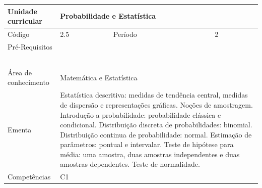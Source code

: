 \clearpage
\newpage

\begin{quadro}[ht!]
  \centering\scriptsize
\caption{Unidade Curricular Probabilidade e Estatística}

\begin{tabular}{|p{2.5cm}|p{2.5cm}|p{2.5cm}|p{2.5cm}|p{2.5cm}|}\hline

  Unidade curricular & \multicolumn{4}{p{10cm}|}{ Probabilidade e Estatística }\\\hline
  Código & 2.5 & Período & \multicolumn{2}{p{5cm}|}{ 2 }\\\hline
  Pré-Requisitos & \multicolumn{4}{p{10cm}|}{  } \\\hline
  \cellcolor{blue1}{ CH PRESENCIAL } &
    \cellcolor{blue1}{CH EAD Síncrona} &
    \cellcolor{blue1}{CH EAD Síncrona Mediada} &
    \cellcolor{blue1}{CH EAD Assíncrona} &
    \cellcolor{blue1}{CH APCC} \\\hline
  \cellcolor{blue1}{ 60 } &
    \cellcolor{blue1}{ 0 } &
    \cellcolor{blue1}{ 0 } &
    \cellcolor{blue1}{ 0 } &
    \cellcolor{blue1}{0} \\\hline
  \cellcolor{blue1}{ CH Teórica } &
    \cellcolor{blue1}{CH Prática} &
    \cellcolor{blue1}{CH Humanidades} &
    \cellcolor{blue1}{CH Extensão} &
    \cellcolor{blue1}{CH EAD TOTAL} \\\hline
  \cellcolor{blue1}{ 30 } &
    \cellcolor{blue1}{ 30 } &
    \cellcolor{blue1}{ 0 } &
    \cellcolor{blue1}{ 0 } &
    \cellcolor{blue1}{ 0 } \\\hline
  \cellcolor{blue1}{CARGA-HORÁRIA TOTAL} & \multicolumn{4}{p{10cm}|}{ \cellcolor{blue1}{ 60 } } \\\hline
  Área de conhecimento & \multicolumn{4}{p{10cm}|}{ Matemática e Estatística } \\\hline
  Ementa & \multicolumn{4}{p{10cm}|}{ Estatística descritiva: medidas de tendência central, medidas de dispersão e representações gráficas. Noções de amostragem. Introdução a probabilidade: probabilidade clássica e condicional. Distribuição discreta de probabilidades: binomial. Distribuição continua de probabilidade: normal. Estimação de parâmetros: pontual e intervalar. Teste de hipótese para média: uma amostra, duas amostras independentes e duas amostras dependentes. Teste de normalidade. } \\\hline
  Competências & \multicolumn{4}{p{10cm}|}{ C1 } \\\hline


  
	\end{tabular}

\end{quadro}



